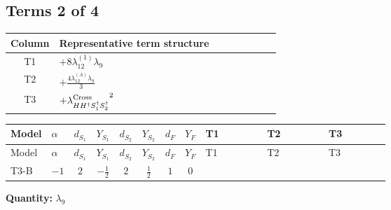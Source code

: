 \documentclass[8pt]{article}
\begin{document}
\begin{landscape}
\subsection*{Terms 2 of 4}
\begin{center}
\begin{tabular}{@{}c >{\raggedright\arraybackslash}p{0.82\linewidth}@{}}
\toprule
Column & Representative term structure \\
\midrule
T1 & \(\displaystyle +8 {\lambda_{12}^{(1)}} {\lambda_{9}}\) \\
\midrule
T2 & \(\displaystyle +\frac{4 {\lambda_{12}^{(A)}} {\lambda_{9}}}{3}\) \\
\midrule
T3 & \(\displaystyle +{\lambda_{H H^\dagger S_1^\dagger S_2^\dagger}^{\rm Cross}}^2\) \\
\midrule
\bottomrule
\end{tabular}
\end{center}
\smallskip
\tiny
\begin{longtable}{@{}llcccccc >{\raggedright\arraybackslash}p{0.21\linewidth} >{\raggedright\arraybackslash}p{0.21\linewidth} >{\raggedright\arraybackslash}p{0.21\linewidth}@{}}
\toprule
Model & $\alpha$ & $d_{S_1}$ & $Y_{S_1}$ & $d_{S_2}$ & $Y_{S_2}$ & $d_F$ & $Y_F$ & T1 & T2 & T3 \\
\midrule
\endfirsthead
\toprule
Model & $\alpha$ & $d_{S_1}$ & $Y_{S_1}$ & $d_{S_2}$ & $Y_{S_2}$ & $d_F$ & $Y_F$ & T1 & T2 & T3 \\
\midrule
\endhead
T3-B & $-1$ & $2$ & $-\frac{1}{2}$ & $2$ & $\frac{1}{2}$ & $1$ & $0$ & \scriptsize\adjustbox{max width=\linewidth}{$\begin{gathered} +8 {\lambda_{12}^{(1)}} {\lambda_{9}}\end{gathered}$} & \scriptsize\adjustbox{max width=\linewidth}{$\begin{gathered} +\frac{4 {\lambda_{12}^{(A)}} {\lambda_{9}}}{3}\end{gathered}$} & \scriptsize\adjustbox{max width=\linewidth}{$\begin{gathered} +{\lambda_{H H^\dagger S_1^\dagger S_2^\dagger}^{\rm Cross}}^2\end{gathered}$} \\
\midrule
\bottomrule
\end{longtable}
\clearpage
\noindent\textbf{Quantity: }$\lambda_{9}$\par\smallskip

\end{landscape}
\end{document}
